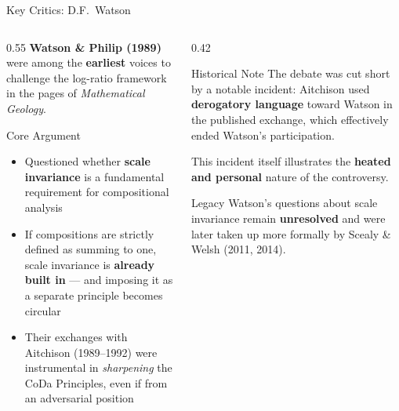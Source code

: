 \begin{frame}{Key Critics: D.F.\ Watson}

\begin{columns}[T]
  \begin{column}{0.55\textwidth}
    \textbf{Watson \& Philip (1989)} were among the \textbf{earliest} voices
    to challenge the log-ratio framework in the pages of
    \textit{Mathematical Geology}.

    \vspace{0.3cm}
    \begin{block}{Core Argument}
      \begin{itemize}
        \item Questioned whether \textbf{scale invariance} is a
              fundamental requirement for compositional analysis
        \item If compositions are strictly defined as summing to one,
              scale invariance is \textbf{already built in} — and imposing
              it as a separate principle becomes circular
        \item Their exchanges with Aitchison (1989--1992) were
              instrumental in \emph{sharpening} the CoDa Principles,
              even if from an adversarial position
      \end{itemize}
    \end{block}
  \end{column}

  \begin{column}{0.42\textwidth}
    \begin{alertblock}{Historical Note}
      The debate was cut short by a notable incident: Aitchison
      used \textbf{derogatory language} toward Watson in the
      published exchange, which effectively ended Watson's
      participation.

      \vspace{0.2cm}
      This incident itself illustrates the \textbf{heated and
      personal} nature of the controversy.
    \end{alertblock}

    \vspace{0.3cm}
    \begin{block}{Legacy}
      Watson's questions about scale invariance remain
      \textbf{unresolved} and were later taken up more formally
      by Scealy \& Welsh (2011, 2014).
    \end{block}
  \end{column}
\end{columns}

\end{frame}

